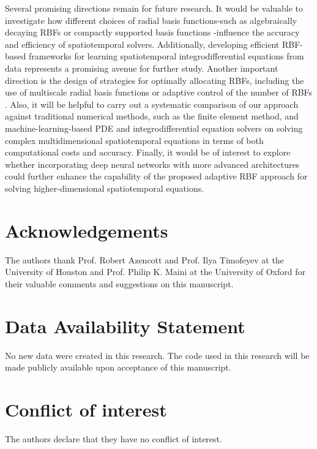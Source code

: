Several promising directions remain for future research. It would be valuable to investigate how different choices of radial basis functions-such as algebraically decaying RBFs or compactly supported basis functions \cite{wendland2017multiscale}-influence the accuracy and efficiency of spatiotemporal solvers. Additionally, developing efficient RBF-based frameworks for learning spatiotemporal integrodifferential equations from data represents a promising avenue for further study. Another important direction is the design of strategies for optimally allocating RBFs, including the use of multiscale radial basis functions \cite{billings2007generalized,kedward2017efficient} or adaptive control of the number of RBFs \cite{shao2025solving}. Also, it will be helpful to carry out a systematic comparison of our approach against traditional numerical methods, such as the finite element method, and machine-learning-based PDE and integrodifferential equation solvers on solving complex multidimensional spatiotemporal equations in terms of both computational costs and accuracy.
Finally, it would be of interest to   
explore whether incorporating deep neural networks with more advanced architectures could further enhance the capability of the proposed adaptive RBF approach for solving higher-dimensional spatiotemporal equations.



\section*{Acknowledgements}
The authors thank Prof. Robert Azencott and Prof. Ilya Timofeyev at the University of Houston and Prof. Philip K. Maini at the University of Oxford for their valuable comments and suggestions on this manuscript. 

\section*{Data Availability Statement}
No new data were created in this research. The code used in this research will be made publicly available upon acceptance of this manuscript.

%
 \section*{Conflict of interest}
%
 The authors declare that they have no conflict of interest.
 
